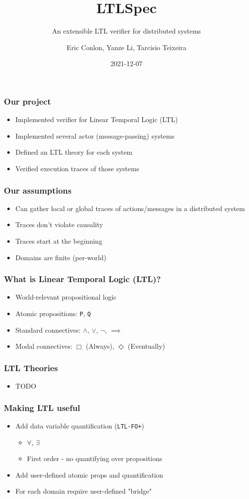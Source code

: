 \documentclass[aspectratio=169]{beamer}
\title{LTLSpec}
\subtitle{An extensible LTL verifier for distributed systems}
\author{Eric Conlon, Yanze Li, Tarcisio Teixeira}
\date{2021-12-07}
\begin{document}
\frame{\titlepage}

\begin{frame}
\frametitle{Our project}
\begin{itemize}
  \item Implemented verifier for Linear Temporal Logic (LTL)
  \item Implemented several actor (message-passing) systems
  \item Defined an LTL theory for each system
  \item Verified execution traces of those systems
\end{itemize}
\end{frame}

\begin{frame}
\frametitle{Our assumptions}
\begin{itemize}
  \item Can gather local or global traces of actions/messages in a distributed system
  \item Traces don't violate causality
  \item Traces start at the beginning
  \item Domains are finite (per-world)
\end{itemize}
\end{frame}

\begin{frame}
\frametitle{What is Linear Temporal Logic (LTL)?}
\begin{itemize}
  \item World-relevant propositional logic
  \item Atomic propositions: \texttt{P}, \texttt{Q}
  \item Standard connectives: $\land$, $\lor$, $\neg$, $\implies$
  \item Modal connectives: $\Box$ (Always), $\Diamond$ (Eventually)
\end{itemize}
\end{frame}

\begin{frame}
\frametitle{LTL Theories}
\begin{itemize}
  \item TODO
\end{itemize}
\end{frame}

\begin{frame}
\frametitle{Making LTL useful}
\begin{itemize}
  \item Add data variable quantification (\texttt{LTL-FO+})
  \begin{itemize}
    \item $\forall$, $\exists$
    \item First order - no quantifying over propositions
  \end{itemize}
  \item Add user-defined atomic props and quantification
  \item For each domain require user-defined "bridge"
\end{itemize}
\end{frame}
\end{document}
